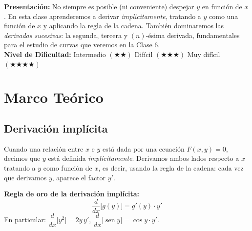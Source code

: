 \documentclass[12pt, letterpaper]{article}
\begin{document}


\vspace{4pt}
\begin{cuadroinfo}
  \small
  \textbf{Presentación:} No siempre es posible (ni conveniente) despejar $y$ en función de $x$. En esta clase aprenderemos a derivar \emph{implícitamente}, tratando a $y$ como una función de $x$ y aplicando la regla de la cadena. También dominaremos las \emph{derivadas sucesivas}: la segunda, tercera y $(n)$-ésima derivada, fundamentales para el estudio de curvas que veremos en la Clase 6.
  \\[6pt]
  \textbf{Nivel de Dificultad:}\quad
  \medio{} Intermedio $(\bigstar\bigstar)$ \quad
  \dificil{} Difícil $(\bigstar\bigstar\bigstar)$ \quad
  \muyDificil{} Muy difícil $(\bigstar\bigstar\bigstar\bigstar)$
\end{cuadroinfo}

\vspace{8pt}

\section{Marco Teórico}

\subsection{Derivación implícita}

Cuando una relación entre $x$ e $y$ está dada por una ecuación $F(x,y) = 0$, decimos que $y$ está definida \emph{implícitamente}. Derivamos ambos lados respecto a $x$ tratando a $y$ como función de $x$, es decir, usando la regla de la cadena: cada vez que derivamos $y$, aparece el factor $y'$.

\begin{cuadroteoria}
  \textbf{Regla de oro de la derivación implícita:}
  \[
    \frac{d}{dx}\bigl[g(y)\bigr] = g'(y)\cdot y'
  \]
  En particular: $\dfrac{d}{dx}\bigl[y^2\bigr] = 2y\,y'$, \quad
  $\dfrac{d}{dx}\bigl[\operatorname{sen} y\bigr] = \cos y \cdot y'$.
\end{cuadroteoria}
\end{document}
